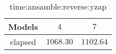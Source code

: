 \begin{table}[!ht]
	\centering
	\begin{tabular}{|c|c|c|}
		\hline
		Models & $4$ & $7$ \\ \hline
		elapsed & $1068.30$ & $1102.64$ \\ \hline
	\end{tabular}
	\caption{time:ansamble:reverse:yzap}
	\label{tab:time:ansamble:reverse:yzap}
\end{table}
